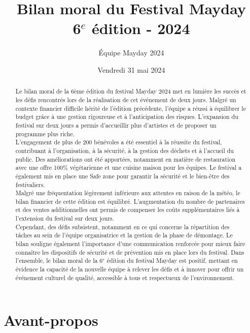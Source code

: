 \documentclass[12pt,a4paper]{report}
\title{Bilan moral du Festival Mayday \\ 6$^e$ édition - 2024}
\author{Équipe Mayday 2024}
\date{Vendredi 31 mai 2024}
\begin{document}
\maketitle

\begin{abstract}
Le bilan moral de la 6ème édition du festival Mayday 2024 met en lumière les succès et les défis rencontrés lors de la réalisation de cet événement de deux jours. Malgré un contexte financier difficile hérité de l’édition précédente, l’équipe a réussi à équilibrer le budget grâce à une gestion rigoureuse et à l’anticipation des risques. L’expansion du festival sur deux jours a permis d’accueillir plus d’artistes et de proposer un programme plus riche.\\

L’engagement de plus de 200 bénévoles a été essentiel à la réussite du festival, contribuant à l’organisation, à la sécurité, à la gestion des déchets et à l’accueil du public. Des améliorations ont été apportées, notamment en matière de restauration avec une offre 100\% végétarienne et une cuisine maison pour les équipes. Le festival a également mis en place une \og Safe zone \fg{} pour garantir la sécurité et le bien-être des festivaliers.\\

Malgré une fréquentation légèrement inférieure aux attentes en raison de la météo, le bilan financier de cette édition est équilibré. L’augmentation du nombre de partenaires et des ventes additionnelles ont permis de compenser les coûts supplémentaires liés à l’extension du festival sur deux jours.\\

Cependant, des défis subsistent, notamment en ce qui concerne la répartition des tâches au sein de l’équipe organisatrice et la gestion de la phase de démontage. Le bilan souligne également l’importance d’une communication renforcée pour mieux faire connaître les dispositifs de sécurité et de prévention mis en place lors du festival. Dans l’ensemble, le bilan moral de la 6$^e$ édition du festival Mayday est positif, mettant en évidence la capacité de la nouvelle équipe à relever les défis et à innover pour offrir un événement culturel de qualité, accessible à tous et respectueux de l’environnement.
\end{abstract}

\tableofcontents

\newpage

\section*{Avant-propos}
\end{document}
